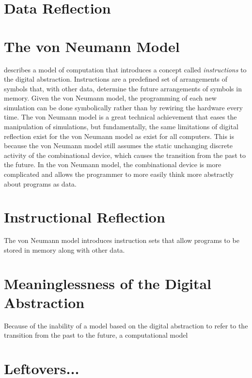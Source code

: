 \section{Data Reflection}



\section{The von Neumann Model}

\cite{von_neumann:1945} describes a model of computation that
introduces a concept called \emph{instructions} to the digital
abstraction.  Instructions are a predefined set of arrangements of
symbols that, with other data, determine the future arrangements of
symbols in memory.  Given the von Neumann model, the programming of
each new simulation can be done symbolically rather than by rewiring
the hardware every time.  The von Neumann model is a great technical
achievement that eases the manipulation of simulations, but
fundamentally, the same limitations of digital reflection exist for
the von Neumann model as exist for all computers.  This is because the
von Neumann model still assumes the static unchanging discrete
activity of the combinational device, which causes the transition from
the past to the future.  In the von Neumann model, the combinational
device is more complicated and allows the programmer to more easily
think more abstractly about programs as data.

\section{Instructional Reflection}

The von Neumann model introduces instruction sets that allow programs
to be stored in memory along with other data.

\section{Meaninglessness of the Digital Abstraction}



Because of the inability of a model based on the digital abstraction
to refer to the transition from the past to the future, a
computational model

\section{Leftovers...}

